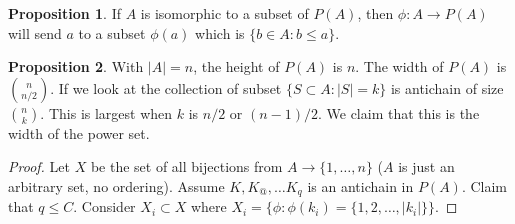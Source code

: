 \documentclass[12pt]{article}
\theoremstyle{definition}
\newtheorem{prop}{Proposition}
\begin{document}
\begin{prop}
    If $A$ is isomorphic to a subset of $P(A)$, then $\phi: A \rightarrow P(A)$
    will send $a$ to a subset $\phi(a)$ which is $\{b \in A: b \le a\}$.
\end{prop}

\begin{prop}
    With $|A| = n$, the height of $P(A)$ is $n$. The width of $P(A)$ is ${n
    \choose n/2}$. If we look at the collection of subset $\{S \subset A: |S| =
    k\}$ is antichain of size ${n \choose k}$. This is largest when $k$ is
    $n/2$ or $(n-1)/2$. We claim that this is the width of the power set.
\end{prop}

\begin{proof}
    Let $X$ be the set of all bijections from $A \rightarrow \{1, \ldots, n\}$
    ($A$ is just an arbitrary set, no ordering). Assume $K, K_@, \ldots K_q$ is
    an antichain in $P(A)$. Claim that $q \le C$. Consider $X_i \subset X$
    where $X_i = \{\phi : \phi(k_i) = \{1, 2, \ldots, |k_i|\}\}$.
\end{proof}
\end{document}
